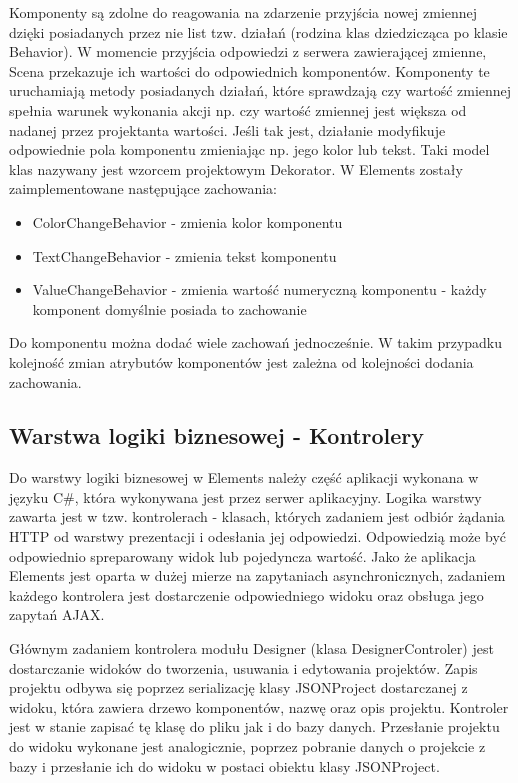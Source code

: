 Komponenty są zdolne do reagowania na zdarzenie przyjścia nowej zmiennej dzięki posiadanych przez nie list tzw. działań (rodzina klas dziedzicząca po klasie Behavior). W momencie przyjścia odpowiedzi z serwera zawierającej zmienne, Scena przekazuje ich wartości do odpowiednich komponentów. Komponenty te uruchamiają metody posiadanych działań, które sprawdzają czy wartość zmiennej spełnia warunek wykonania akcji np. czy wartość zmiennej jest większa od nadanej przez projektanta wartości. Jeśli tak jest, działanie modyfikuje odpowiednie pola komponentu zmieniając np. jego kolor lub tekst. Taki model klas nazywany jest wzorcem projektowym Dekorator. 
W Elements zostały zaimplementowane następujące zachowania:
\begin{itemize}
\item ColorChangeBehavior - zmienia kolor komponentu
\item TextChangeBehavior - zmienia tekst komponentu
\item ValueChangeBehavior - zmienia wartość numeryczną komponentu - każdy komponent domyślnie posiada to zachowanie
\end{itemize}
Do komponentu można dodać wiele zachowań jednocześnie. W takim przypadku kolejność zmian atrybutów komponentów jest zależna od kolejności dodania zachowania.

\subsection{Warstwa logiki biznesowej - Kontrolery}
Do warstwy logiki biznesowej w Elements należy część aplikacji wykonana w języku C\#, która wykonywana jest przez serwer aplikacyjny. Logika warstwy zawarta jest w tzw. kontrolerach - klasach, których zadaniem jest odbiór żądania HTTP od warstwy prezentacji i odesłania jej odpowiedzi. Odpowiedzią może być odpowiednio spreparowany widok lub pojedyncza wartość. Jako że aplikacja Elements jest oparta w dużej mierze na zapytaniach asynchronicznych, zadaniem każdego kontrolera jest dostarczenie odpowiedniego widoku oraz obsługa jego zapytań AJAX.

Głównym zadaniem kontrolera modułu Designer (klasa DesignerControler) jest dostarczanie widoków do tworzenia, usuwania i edytowania projektów. Zapis projektu odbywa się poprzez serializację klasy JSONProject dostarczanej z widoku, która zawiera drzewo komponentów, nazwę oraz opis projektu. Kontroler jest w stanie zapisać tę klasę do pliku jak i do bazy danych. Przesłanie projektu do widoku wykonane jest analogicznie, poprzez pobranie danych o projekcie z bazy i przesłanie ich do widoku w postaci obiektu klasy JSONProject. 

